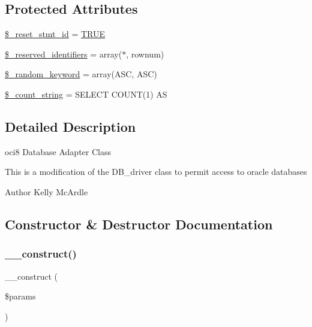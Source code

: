 \subsection*{Protected Attributes}
\begin{DoxyCompactItemize}
\item 
\mbox{\hyperlink{class_c_i___d_b__oci8__driver_ad21690f62001483fa1d13b9ee6143923}{\$\+\_\+reset\+\_\+stmt\+\_\+id}} = \mbox{\hyperlink{constants_8php_ae04a3efe6aa42044f803ee90c2277846}{T\+R\+UE}}
\item 
\mbox{\hyperlink{class_c_i___d_b__oci8__driver_aa3298c4c62fbee8bb09f1b75b633fb0d}{\$\+\_\+reserved\+\_\+identifiers}} = array(\textquotesingle{}$\ast$\textquotesingle{}, \textquotesingle{}rownum\textquotesingle{})
\item 
\mbox{\hyperlink{class_c_i___d_b__oci8__driver_a10213aa6e05f6d924d3277bb1d2fea00}{\$\+\_\+random\+\_\+keyword}} = array(\textquotesingle{}A\+SC\textquotesingle{}, \textquotesingle{}A\+SC\textquotesingle{})
\item 
\mbox{\hyperlink{class_c_i___d_b__oci8__driver_a06c80bac2ecbd0557827e96949c23097}{\$\+\_\+count\+\_\+string}} = \textquotesingle{}S\+E\+L\+E\+CT C\+O\+U\+NT(1) AS \textquotesingle{}
\end{DoxyCompactItemize}


\subsection{Detailed Description}
oci8 Database Adapter Class

This is a modification of the D\+B\+\_\+driver class to permit access to oracle databases

\begin{DoxyAuthor}{Author}
Kelly Mc\+Ardle 
\end{DoxyAuthor}


\subsection{Constructor \& Destructor Documentation}
\mbox{\label{class_c_i___d_b__oci8__driver_a9162320adff1a1a4afd7f2372f753a3e}} 
\subsubsection{\texorpdfstring{\+\_\+\+\_\+construct()}{\_\_construct()}}
{\footnotesize\ttfamily \+\_\+\+\_\+construct (\begin{DoxyParamCaption}\item[{}]{\$params }\end{DoxyParamCaption})}

